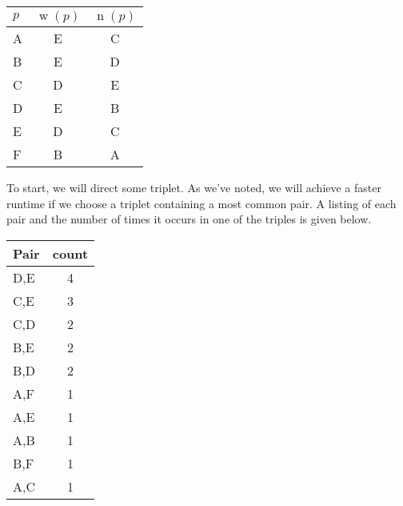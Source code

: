 \documentclass[12pt,x11names, rgb]{article}
\DeclareMathOperator{\w}{w}
\DeclareMathOperator{\n}{n}
\begin{document}
    \begin{center}
        \begin{tabular}{ l | c | c}
         $p$ & $\w(p)$ & $\n(p)$ \\
         \hline
          A &  E& C\\
          B &  E& D\\
          C &  D& E\\
          D &  E& B\\
          E &  D& C\\
          F &  B& A
        \end{tabular} %
    \end{center}
    \begin{comment}
        Assume E -> D
          E -> D is given, so player B's choices give B -> D
          E -> D is given, so player B's choices give B -> E
          E -> D is given, so player C's choices give E -> C
          E -> D is given, so player C's choices give D -> C
          E -> D is given, so player D's choices give B -> D
          E -> D is given, so player D's choices give B -> E
          E -> D is given, so player E's choices give E -> C
          E -> D is given, so player E's choices give D -> C
          D -> C is given, so player C's choices give E -> C
          D -> C is given, so player C's choices give E -> D
          D -> C is given, so player E's choices give E -> C
          D -> C is given, so player E's choices give E -> D
          E -> C is given, so player A's choices give A -> C
          E -> C is given, so player A's choices give A -> E
          E -> C is given, so player E's choices give D -> C
          E -> C is given, so player E's choices give E -> D
          D -> C is given, so player E's choices give E -> C
          D -> C is given, so player E's choices give E -> D
          Assume F -> B
            F -> B is given, so player F's choices give F -> A
            F -> B is given, so player F's choices give B -> A
            No more players to try, and G is acyclic: Success!
         F B A E D C
    \end{comment}
    To start, we will direct some triplet. As we've noted, we will achieve a faster runtime if we choose a triplet containing a most common pair. A listing of each pair and the number of times it occurs in one of the triples is given below.
    \begin{center}
    \begin{tabular}{l | c}
        Pair & count \\
        \hline
        D,E & 4 \\
        C,E & 3 \\
        C,D & 2 \\
        B,E & 2 \\
        B,D & 2 \\
        A,F & 1 \\
        A,E & 1 \\
        A,B & 1 \\
        B,F & 1 \\
        A,C & 1 
    \end{tabular}
    \end{center}
\end{document}
